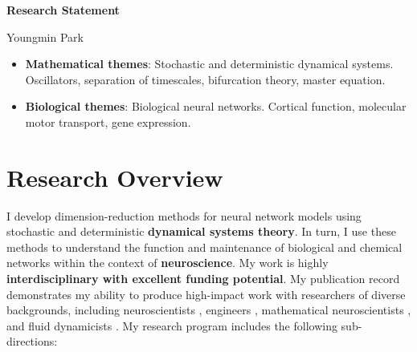 \documentclass[a4paper,11pt]{article}
\begin{document}
	
	\begin{center}
		\Large \textbf{Research Statement}
		
		\Large Youngmin Park
	\end{center}

    \begin{itemize}
        \item \textbf{Mathematical themes}: Stochastic and deterministic dynamical systems. Oscillators, separation of timescales, bifurcation theory, master equation.
        \item\textbf{Biological themes}: Biological neural networks. Cortical function, molecular motor transport, gene expression.
    \end{itemize}
	
	\section{Research Overview}
	
	I develop dimension-reduction methods for neural network models using stochastic and deterministic \textbf{dynamical systems theory}. In turn, I use these methods to understand the function and maintenance of biological and chemical networks within the context of \textbf{neuroscience}. My work is highly \textbf{interdisciplinary with excellent funding potential}. My publication record demonstrates my ability to produce high-impact work with researchers of diverse backgrounds, including neuroscientists \cite{park2020circuit,shaw2012phase}, engineers \cite{ermentrout2019recent,park2021high}, mathematical neuroscientists \cite{park2016weakly,park2018infinitesimal,park2018multiple,park2018scalar}, and fluid dynamicists \cite{park2020dynamics,park2021coarse,fai2020global}. My research program includes the following sub-directions:
	
\end{document}
